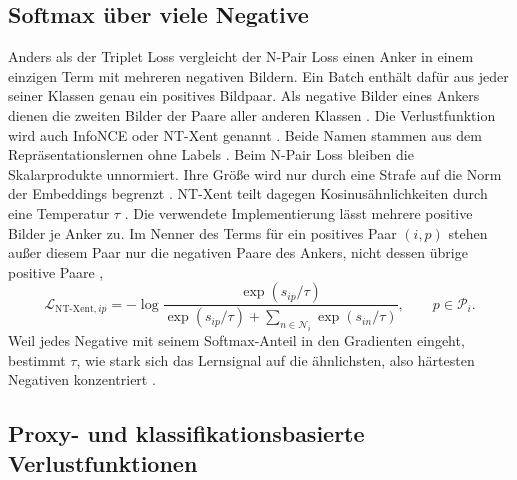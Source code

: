\subsection{Softmax über viele Negative}
\label{sec:verluste:ntxent}

Anders als der Triplet Loss vergleicht der N-Pair Loss einen Anker in einem einzigen Term mit mehreren negativen Bildern. Ein Batch enthält dafür aus jeder seiner Klassen genau ein positives Bildpaar. Als negative Bilder eines Ankers dienen die zweiten Bilder der Paare aller anderen Klassen \cite{sohn_improved_2016}. Die Verlustfunktion wird auch InfoNCE oder \ac{NT-Xent} genannt \cite{musgrave_metric_2020}. Beide Namen stammen aus dem Repräsentationslernen ohne Labels \cite{oord_representation_2018, chen_simple_2020}. Beim N-Pair Loss bleiben die Skalarprodukte unnormiert. Ihre Größe wird nur durch eine Strafe auf die Norm der Embeddings begrenzt \cite{sohn_improved_2016}. \ac{NT-Xent} teilt dagegen Kosinusähnlichkeiten durch eine Temperatur $\tau$ \cite{chen_simple_2020}. Die verwendete Implementierung lässt mehrere positive Bilder je Anker zu. Im Nenner des Terms für ein positives Paar $(i,p)$ stehen außer diesem Paar nur die negativen Paare des Ankers, nicht dessen übrige positive Paare \cite{musgrave_pytorch_2020, chen_simple_2020, oord_representation_2018},
\begin{equation}  
  \mathcal{L}_{\mathrm{NT\text{-}Xent},ip}=-\log\frac{\exp(s_{ip}/\tau)}{\exp(s_{ip}/\tau)+\sum_{n\in\mathcal{N}_i}\exp(s_{in}/\tau)},\qquad p\in\mathcal{P}_i.
  \label{eq:ntxent}
\end{equation}
Weil jedes Negative mit seinem Softmax-Anteil in den Gradienten eingeht, bestimmt $\tau$, wie stark sich das Lernsignal auf die ähnlichsten, also härtesten Negativen konzentriert \cite{chen_simple_2020}. 

\subsection{Proxy- und klassifikationsbasierte Verlustfunktionen}
\label{sec:verluste:proxy}

